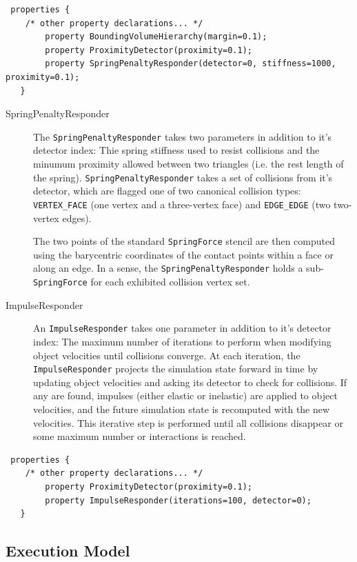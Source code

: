 \begin{verbatim}
 properties { 
	/* other property declarations... */
        property BoundingVolumeHierarchy(margin=0.1);
        property ProximityDetector(proximity=0.1);
        property SpringPenaltyResponder(detector=0, stiffness=1000, proximity=0.1);
   }
\end{verbatim}
\begin{description}
\item[SpringPenaltyResponder] The \texttt{SpringPenaltyResponder}
  takes two parameters in addition to it's detector index: Thie spring
  stiffness used to resist collisions and the minumum proximity
  allowed between two triangles (i.e. the rest length of the
  spring). \texttt{SpringPenaltyResponder} takes a set of collisions
  from it's detector, which are flagged one of two canonical collision
  types: \texttt{VERTEX\_FACE} (one vertex and a three-vertex face)
  and \texttt{EDGE\_EDGE} (two two-vertex edges).

  The two points of the standard \texttt{SpringForce} stencil are then
  computed using the barycentric coordinates of the contact points
  within a face or along an edge. In a sense, the
  \texttt{SpringPenaltyResponder} holds a sub-\texttt{SpringForce} for
  each exhibited collision vertex set.

\item[ImpulseResponder] An \texttt{ImpulseResponder} takes one
  parameter in addition to it's detector index: The maximum number of
  iterations to perform when modifying object velocities until
  collisions converge. At each iteration, the
  \texttt{ImpulseResponder} projects the simulation state forward in
  time by updating object velocities and asking its detector to check
  for collisions. If any are found, impulses (either elastic or
  inelastic) are applied to object velocities, and the future
  simulation state is recomputed with the new velocities. This
  iterative step is performed until all collisions disappear or some
  maximum number or interactions is reached.
\end{description}
\begin{verbatim}
 properties { 
	/* other property declarations... */
        property ProximityDetector(proximity=0.1);
        property ImpulseResponder(iterations=100, detector=0);
   }
\end{verbatim}

\subsection{Execution Model}

